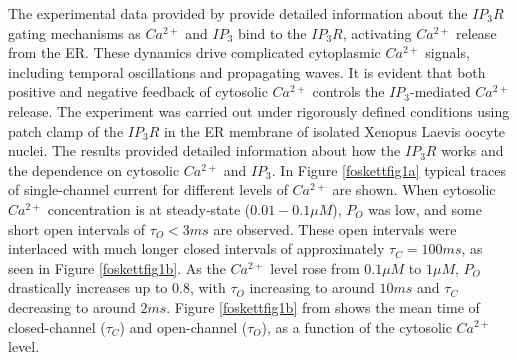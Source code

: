 The experimental data provided by  provide detailed information about the $IP_3R$ gating mechanisms as $Ca^{2+}$ and $IP_3$ bind to the $IP_3R$, activating $Ca^{2+}$ release from the ER. These dynamics drive complicated cytoplasmic $Ca^{2+}$ signals, including temporal oscillations and propagating waves. It is evident that both positive and negative feedback of cytosolic $Ca^{2+}$ controls the $IP_3$-mediated $Ca^{2+}$ release. The experiment was carried out under rigorously defined conditions using patch clamp of the $IP_3R$ in the ER membrane of isolated Xenopus Laevis oocyte nuclei. The results provided detailed information about how the $IP_3R$ works and the dependence on cytosolic $Ca^{2+}$ and $IP_3$. In Figure \ref{foskettfig1a} typical traces of single-channel current for different levels of $Ca^{2+}$ are shown. When cytosolic $Ca^{2+}$ concentration is at steady-state ($0.01-0.1 \mu M$), $P_O$ was low, and some short open intervals of $\tau_O<3 ms$ are observed. These open intervals were interlaced with much longer closed intervals of approximately $\tau_C=100 ms$, as seen in Figure \ref{foskettfig1b}. As the $Ca^{2+}$ level rose from $0.1 \mu M$ to $1\mu M$, $P_O$ drastically increases up to $0.8$, with $\tau_O$ increasing to around $10ms$ and $\tau_C$ decreasing to around $2ms$. Figure \ref{foskettfig1b} from  shows the mean time of closed-channel ($\tau_C$) and open-channel ($\tau_O$), as a function of the cytosolic $Ca^{2+}$ level.

